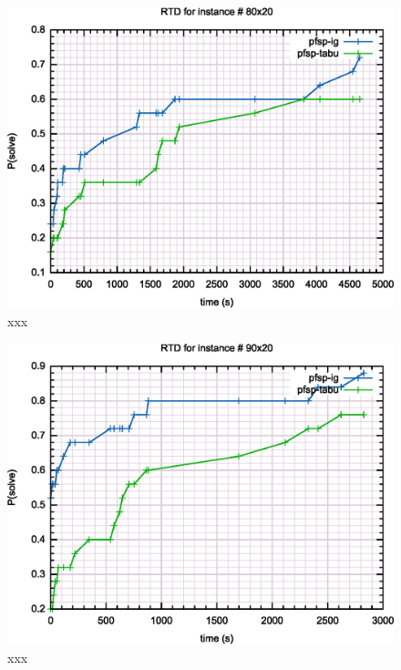 \begin{figure}[H]
	\centering
	\includegraphics[width=\textwidth]{fig/qrd/80x20}
	\caption{xxx}
\end{figure}

\begin{figure}[H]
	\centering
	\includegraphics[width=\textwidth]{fig/qrd/90x20}
	\caption{xxx}
\end{figure}